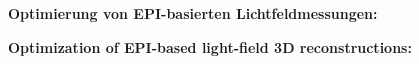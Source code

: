 \thispagestyle{empty}
\begin{center}
  \begin{minipage}[c][0.48\textheight][b]{0.9\textwidth}
    \small
    \textbf{
      Optimierung von EPI-basierten Lichtfeldmessungen:
    }\par
    \vspace{\baselineskip}
    
  \end{minipage}\par
  \vfill
  \begin{minipage}[c][0.48\textheight][b]{0.9\textwidth}
    \small
    \textbf{
      Optimization of EPI-based light-field 3D reconstructions:
    }\par
    \vspace{\baselineskip}
    
  \end{minipage}
\end{center}
